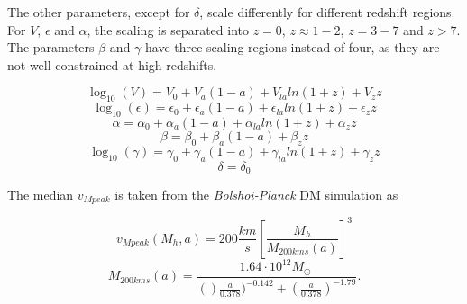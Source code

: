The other parameters, except for $\delta$, scale differently for different redshift regions. For $V$, $\epsilon$ and $\alpha$, the scaling is separated into $z=0$, $z\approx 1-2$, $z=3-7$ and $z>7$. The parameters $\beta$ and $\gamma$ have three scaling regions instead of four, as they are not well constrained at high redshifts. 

\begin{equation}
    \log_{10}(V) = V_0 + V_a(1-a)+V_{la}ln(1+z)+V_z z
\end{equation}
\begin{equation}
    \log_{10}(\epsilon) = \epsilon_0 + \epsilon_a(1-a)+\epsilon_{la}ln(1+z)+\epsilon_z z
\end{equation}
\begin{equation}
    \alpha = \alpha_0 + \alpha_a(1-a)+\alpha_{la}ln(1+z)+\alpha_z z
\end{equation}
\begin{equation}
    \beta = \beta_0 + \beta_a(1-a)+\beta_z z
\end{equation}
\begin{equation}
    \log_{10}(\gamma) = \gamma_0 + \gamma_a(1-a)+\gamma_{la}ln(1+z)+\gamma_z z
\end{equation}
\begin{equation}
    \delta = \delta_0
\end{equation}

The median $v_{Mpeak}$ is taken from the \textit{Bolshoi-Planck} DM simulation as

\begin{equation}
    v_{Mpeak}(M_h, a) = 200 \frac{km}{s}\left[ \frac{M_h}{M_{200kms}(a)}\right]^3
    \label{v_mpeak-M_h-relation}
\end{equation}
\begin{equation}
    M_{200kms}(a) = \frac{1.64 \cdot 10^{12} M_\odot\ }{()\frac{a}{0.378})^{-0.142}+(\frac{a}{0.378})^{-1.79}} .
\end{equation}


